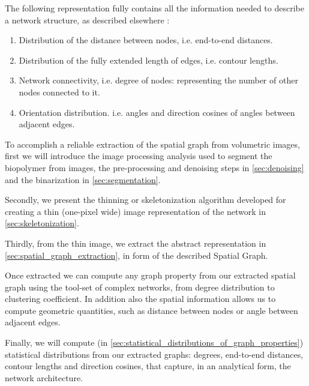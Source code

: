 The following representation fully contains all the information needed to describe a network structure, as described elsewhere \cite{palmer_constitutive_2008}:
\begin{enumerate}[topsep=0pt]
  \item Distribution of the distance between nodes, i.e. end-to-end distances.
  \item Distribution of the fully extended length of edges, i.e. contour lengths.
  \item Network connectivity, i.e. degree of nodes: representing the number of other nodes connected to it.
  \item Orientation distribution. i.e. angles and direction cosines of angles between adjacent edges.
\end{enumerate}

To accomplish a reliable extraction of the spatial graph from volumetric images, first we will introduce the image processing analysis used to segment the biopolymer from images, the pre-processing and denoising steps in \autoref{sec:denoising} and the binarization in \autoref{sec:segmentation}.

Secondly, we present the thinning or skeletonization
algorithm developed for creating a thin (one-pixel wide) image representation of the network in \autoref{sec:skeletonization}.

Thirdly, from the thin image, we extract the abstract representation in \autoref{sec:spatial_graph_extraction}, in form of the described \gls{Spatial Graph}.

Once extracted we can compute any \gls{graph} property from our extracted spatial graph using the tool-set of complex networks,
from degree distribution to clustering coefficient. In addition also the spatial information allows us to compute geometric quantities, such as distance between nodes or angle between adjacent edges.

Finally, we will compute (in \autoref{sec:statistical_distributions_of_graph_properties}) statistical distributions from our extracted graphs: degrees, end-to-end distances, contour lengths and direction cosines, that capture, in an analytical form, the network architecture.

